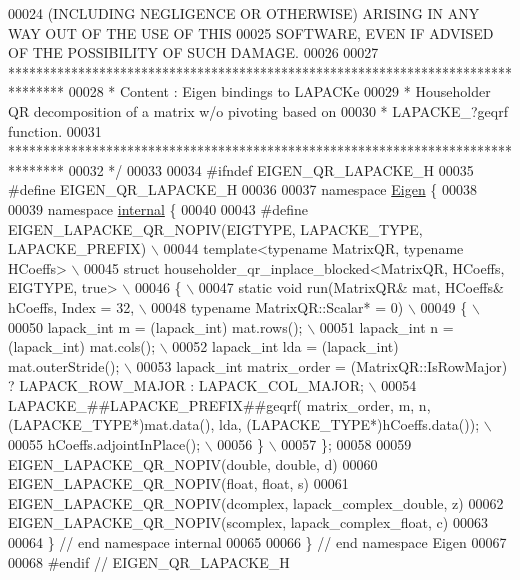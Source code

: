 \begin{DoxyCode}
00024 \textcolor{comment}{ (INCLUDING NEGLIGENCE OR OTHERWISE) ARISING IN ANY WAY OUT OF THE USE OF THIS}
00025 \textcolor{comment}{ SOFTWARE, EVEN IF ADVISED OF THE POSSIBILITY OF SUCH DAMAGE.}
00026 \textcolor{comment}{}
00027 \textcolor{comment}{ ********************************************************************************}
00028 \textcolor{comment}{ *   Content : Eigen bindings to LAPACKe}
00029 \textcolor{comment}{ *    Householder QR decomposition of a matrix w/o pivoting based on}
00030 \textcolor{comment}{ *    LAPACKE\_?geqrf function.}
00031 \textcolor{comment}{ ********************************************************************************}
00032 \textcolor{comment}{*/}
00033 
00034 \textcolor{preprocessor}{#ifndef EIGEN\_QR\_LAPACKE\_H}
00035 \textcolor{preprocessor}{#define EIGEN\_QR\_LAPACKE\_H}
00036 
00037 \textcolor{keyword}{namespace }\hyperlink{namespace_eigen}{Eigen} \{ 
00038 
00039 \textcolor{keyword}{namespace }\hyperlink{namespaceinternal}{internal} \{
00040 
00043 \textcolor{preprocessor}{#define EIGEN\_LAPACKE\_QR\_NOPIV(EIGTYPE, LAPACKE\_TYPE, LAPACKE\_PREFIX) \(\backslash\)}
00044 \textcolor{preprocessor}{template<typename MatrixQR, typename HCoeffs> \(\backslash\)}
00045 \textcolor{preprocessor}{struct householder\_qr\_inplace\_blocked<MatrixQR, HCoeffs, EIGTYPE, true> \(\backslash\)}
00046 \textcolor{preprocessor}{\{ \(\backslash\)}
00047 \textcolor{preprocessor}{  static void run(MatrixQR& mat, HCoeffs& hCoeffs, Index = 32, \(\backslash\)}
00048 \textcolor{preprocessor}{      typename MatrixQR::Scalar* = 0) \(\backslash\)}
00049 \textcolor{preprocessor}{  \{ \(\backslash\)}
00050 \textcolor{preprocessor}{    lapack\_int m = (lapack\_int) mat.rows(); \(\backslash\)}
00051 \textcolor{preprocessor}{    lapack\_int n = (lapack\_int) mat.cols(); \(\backslash\)}
00052 \textcolor{preprocessor}{    lapack\_int lda = (lapack\_int) mat.outerStride(); \(\backslash\)}
00053 \textcolor{preprocessor}{    lapack\_int matrix\_order = (MatrixQR::IsRowMajor) ? LAPACK\_ROW\_MAJOR : LAPACK\_COL\_MAJOR; \(\backslash\)}
00054 \textcolor{preprocessor}{    LAPACKE\_##LAPACKE\_PREFIX##geqrf( matrix\_order, m, n, (LAPACKE\_TYPE*)mat.data(), lda,
       (LAPACKE\_TYPE*)hCoeffs.data()); \(\backslash\)}
00055 \textcolor{preprocessor}{    hCoeffs.adjointInPlace(); \(\backslash\)}
00056 \textcolor{preprocessor}{  \} \(\backslash\)}
00057 \textcolor{preprocessor}{\};}
00058 
00059 EIGEN\_LAPACKE\_QR\_NOPIV(\textcolor{keywordtype}{double}, \textcolor{keywordtype}{double}, d)
00060 EIGEN\_LAPACKE\_QR\_NOPIV(\textcolor{keywordtype}{float}, \textcolor{keywordtype}{float}, s)
00061 EIGEN\_LAPACKE\_QR\_NOPIV(dcomplex, lapack\_complex\_double, z)
00062 EIGEN\_LAPACKE\_QR\_NOPIV(scomplex, lapack\_complex\_float, c)
00063 
00064 \} \textcolor{comment}{// end namespace internal}
00065 
00066 \} \textcolor{comment}{// end namespace Eigen}
00067 
00068 \textcolor{preprocessor}{#endif // EIGEN\_QR\_LAPACKE\_H}
\end{DoxyCode}
